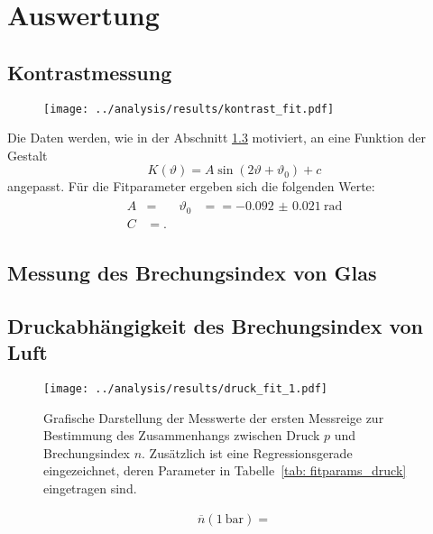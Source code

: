 \section{Auswertung}


\subsection{Kontrastmessung}


\begin{figure}
    \centering
    \texttt{[image: ../analysis/results/kontrast\_fit.pdf]}
\end{figure}

Die Daten werden, wie in der Abschnitt \ref{} motiviert, an eine Funktion der Gestalt
\begin{equation}
    K(\vartheta) = A \sin \left(2 \vartheta + \vartheta_0 \right) + c 
\end{equation}
angepasst. Für die Fitparameter ergeben sich die folgenden Werte:
\begin{align}
    \begin{aligned}
    A &=  \quad  & \vartheta_0 &=  = \SI{-0.092(21)}{\radian} \\ 
    C &= .
    \end{aligned}
\end{align}



\subsection{Messung des Brechungsindex von Glas}




\subsection{Druckabhängigkeit des Brechungsindex von Luft}


\begin{figure}
    \centering
    \texttt{[image: ../analysis/results/druck\_fit\_1.pdf]}
    \label{fig: fit_druck}
    \caption{Grafische Darstellung der Messwerte der ersten Messreige zur Bestimmung des Zusammenhangs zwischen 
    Druck $p$ und Brechungsindex $n$. Zusätzlich ist eine Regressionsgerade eingezeichnet, deren Parameter in 
    Tabelle~\ref{tab: fitparams_druck} eingetragen sind.}
\end{figure}




\begin{align}
    \overline{n}\left(\SI{1}{\bar} \right) = 
\end{align}


